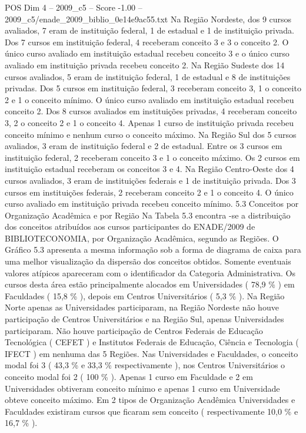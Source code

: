\begin{textsample}{POS Dim 4 – 2009\_c5 – Score -1.00 – 2009\_c5/enade\_2009\_biblio\_0e14e9ac55.txt}
Na Região Nordeste, dos 9 cursos avaliados, 7 eram de instituição federal, 1 de estadual e 1 de instituição privada.
Dos 7 cursos em instituição federal, 4 receberam conceito 3 e 3 o conceito 2.
O único curso avaliado em instituição estadual recebeu conceito 3 e o único curso avaliado em instituição privada recebeu conceito 2.
Na Região Sudeste dos 14 cursos avaliados, 5 eram de instituição federal, 1 de estadual e 8 de instituições privadas.
Dos 5 cursos em instituição federal, 3 receberam conceito 3, 1 o conceito 2 e 1 o conceito mínimo.
O único curso avaliado em instituição estadual recebeu conceito 2.
Dos 8 cursos avaliados em instituições privadas, 4 receberam conceito 3, 2 o conceito 2 e 1 o conceito 4.
Apenas 1 curso de instituição privada recebeu conceito mínimo e nenhum curso o conceito máximo.
Na Região Sul dos 5 cursos avaliados, 3 eram de instituição federal e 2 de estadual.
Entre os 3 cursos em instituição federal, 2 receberam conceito 3 e 1 o conceito máximo.
Os 2 cursos em instituição estadual receberam os conceitos 3 e 4.
Na Região Centro-Oeste dos 4 cursos avaliados, 3 eram de instituições federais e 1 de instituição privada.
Dos 3 cursos em instituições federais, 2 receberam conceito 2 e 1 o conceito 4.
O único curso avaliado em instituição privada recebeu conceito mínimo. 5.3 Conceitos por Organização Acadêmica e por Região Na Tabela 5.3 encontra -se a distribuição dos conceitos atribuídos aos cursos participantes do ENADE/2009 de BIBLIOTECONOMIA, por Organização Acadêmica, segundo as Regiões.
O Gráfico 5.3 apresenta a mesma informação sob a forma de diagrama de caixa para uma melhor visualização da dispersão dos conceitos obtidos.
Somente eventuais valores atípicos apareceram com o identificador da Categoria Administrativa.
Os cursos desta área estão principalmente alocados em Universidades ( 78,9 \% ) em Faculdades ( 15,8 \% ), depois em Centros Universitários ( 5,3 \% ).
Na Região Norte apenas as Universidades participaram, na Região Nordeste não houve participação de Centros Universitários e na Região Sul, apenas Universidades participaram.
Não houve participação de Centros Federais de Educação Tecnológica ( CEFET ) e Institutos Federais de Educação, Ciência e Tecnologia ( IFECT ) em nenhuma das 5 Regiões.
Nas Universidades e Faculdades, o conceito modal foi 3 ( 43,3 \% e 33,3 \% respectivamente ), nos Centros Universitários o conceito modal foi 2 ( 100 \% ).
Apenas 1 curso em Faculdade e 2 em Universidades obtiveram conceito mínimo e apenas 1 curso em Universidade obteve conceito máximo.
Em 2 tipos de Organização Acadêmica Universidades e Faculdades existiram cursos que ficaram sem conceito ( respectivamente 10,0 \% e 16,7 \% ).

\end{textsample}
